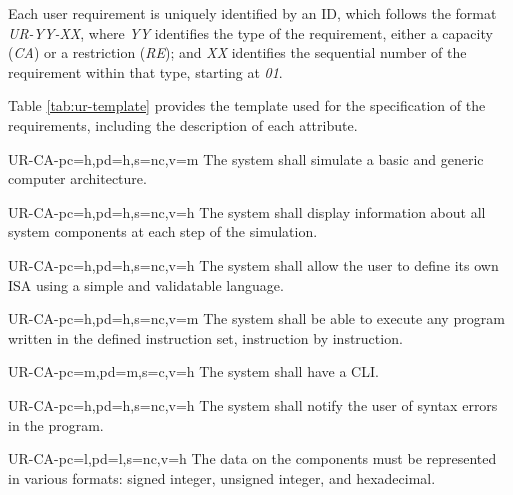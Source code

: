 Each user requirement is uniquely identified by an ID, which follows the format \textit{UR-YY-XX}, where \textit{YY} identifies the type of the requirement, either a capacity (\textit{CA}) or a restriction (\textit{RE}); and \textit{XX} identifies the sequential number of the requirement within that type, starting at \textit{01}.

Table \ref{tab:ur-template} provides the template used for the specification of the requirements, including the description of each attribute.




\setcounter{i}{1}

\begin{userReq}{UR-CA-}{pc=h,pd=h,s=nc,v=m}
  The system shall simulate a basic and generic computer architecture.
\end{userReq}

\begin{userReq}{UR-CA-}{pc=h,pd=h,s=nc,v=h}
  The system shall display information about all system components at each step of the simulation.
\end{userReq}

\begin{userReq}{UR-CA-}{pc=h,pd=h,s=nc,v=h}
  The system shall allow the user to define its own \gls{ISA} using a simple and validatable language.
\end{userReq}

\begin{userReq}{UR-CA-}{pc=h,pd=h,s=nc,v=m}
  The system shall be able to execute any program written in the defined instruction set, instruction by instruction.
\end{userReq}

\begin{userReq}{UR-CA-}{pc=m,pd=m,s=c,v=h}
  The system shall have a \gls{CLI}.
\end{userReq}

\begin{userReq}{UR-CA-}{pc=h,pd=h,s=nc,v=h}
  The system shall notify the user of syntax errors in the program.
\end{userReq}

\begin{userReq}{UR-CA-}{pc=l,pd=l,s=nc,v=h}
  The data on the components must be represented in various formats: signed integer, unsigned integer, and hexadecimal.
\end{userReq}

